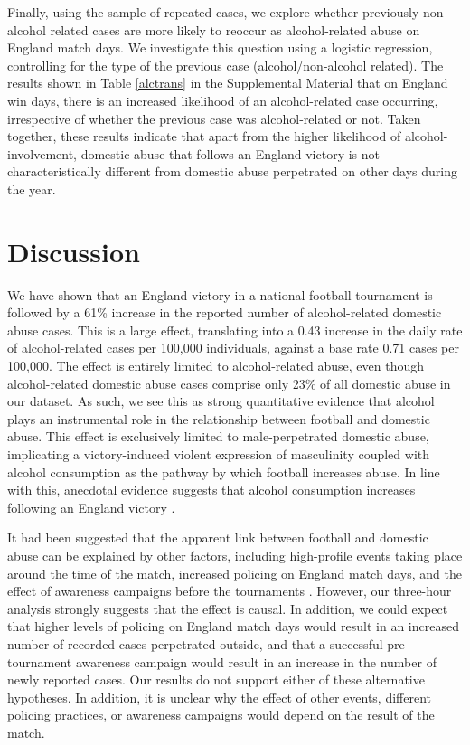 \documentclass[12pt, a4paper]{article}
\begin{document}
Finally, using the sample of repeated cases, we explore whether previously non-alcohol related cases are more likely to reoccur as alcohol-related abuse on England match days. We investigate this question using a logistic regression, controlling for the type of the previous case (alcohol/non-alcohol related). The results shown in Table \ref{alctrans} in the Supplemental Material that on England win days, there is an increased likelihood of an alcohol-related case occurring, irrespective of whether the previous case was alcohol-related or not. Taken together, these results indicate that apart from the higher likelihood of alcohol-involvement, domestic abuse that follows an England victory is not characteristically different from domestic abuse perpetrated on other days during the year.



\section*{Discussion}

We have shown that an England victory in a national football tournament is followed by a 61\% increase in the reported number of alcohol-related domestic abuse cases. This is a large effect, translating into a 0.43 increase in the daily rate of alcohol-related cases per 100,000 individuals, against a base rate 0.71 cases per 100,000. The effect is entirely limited to alcohol-related abuse, even though alcohol-related domestic abuse cases comprise only 23\% of all domestic abuse in our dataset. As such, we see this as strong quantitative evidence that alcohol plays an instrumental role in the relationship between football and domestic abuse. This effect is exclusively limited to male-perpetrated domestic abuse, implicating a victory-induced violent expression of masculinity coupled with alcohol consumption as the pathway by which football increases abuse. In line with this, anecdotal evidence suggests that alcohol consumption increases following an England victory \cite{Davies2018}. 

It had been suggested that the apparent link between football and domestic abuse can be explained by other factors, including high-profile events taking place around the time of the match, increased policing on England match days, and the effect of awareness campaigns before the tournaments \cite{Brooks-Hay2018}. However, our three-hour analysis strongly suggests that the effect is causal. In addition, we could expect that higher levels of policing on England match days would result in an increased number of recorded cases perpetrated outside, and that a successful pre-tournament awareness campaign would result in an increase in the number of newly reported cases. Our results do not support either of these alternative hypotheses. In addition, it is unclear why the effect of other events, different policing practices, or awareness campaigns would depend on the result of the match. 
\end{document}
